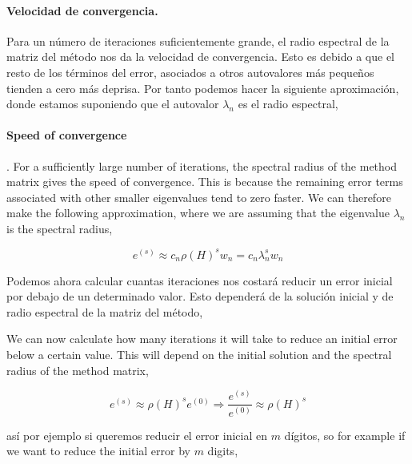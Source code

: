 \begin{paracol}{2}
\paragraph{Velocidad de convergencia.} Para un número de iteraciones suficientemente grande, el radio espectral de la matriz del método nos da la velocidad de convergencia. Esto es debido a que el resto de los términos del error, asociados a otros autovalores más pequeños tienden a cero más  deprisa. Por tanto podemos hacer la siguiente aproximación, donde estamos suponiendo que el autovalor $\lambda_n$ es el radio espectral,

\switchcolumn
\paragraph{Speed of convergence}. For a sufficiently large number of iterations, the spectral radius of the method matrix gives the speed of convergence. This is because the remaining error terms associated with other smaller eigenvalues tend to zero faster. We can therefore make the following approximation, where we are assuming that the eigenvalue $\lambda_n$ is the spectral radius,
\end{paracol}

\begin{equation*}
e^{(s)}\approx c_n \rho(H)^s w_n= c_n \lambda_n^s w_n
\end{equation*}

\begin{paracol}{2}

Podemos ahora calcular cuantas iteraciones nos costará reducir un error inicial por debajo de un determinado valor. Esto dependerá de la solución inicial y de radio espectral de la matriz del método,

\switchcolumn
We can now calculate how many iterations it will take to reduce an initial error below a certain value. This will depend on the initial solution and the spectral radius of the method matrix,

\end{paracol}

\begin{equation*}
e^{(s)}\approx  \rho(H)^s e^{(0)} \Rightarrow \frac{e^{(s)}}{e^{(0)}} \approx \rho(H)^s
\end{equation*}

\begin{paracol}{2}
así por ejemplo si queremos reducir el error inicial en $m$ dígitos,
\switchcolumn
so for example if we want to reduce the initial error by $m$ digits,
\end{paracol}

